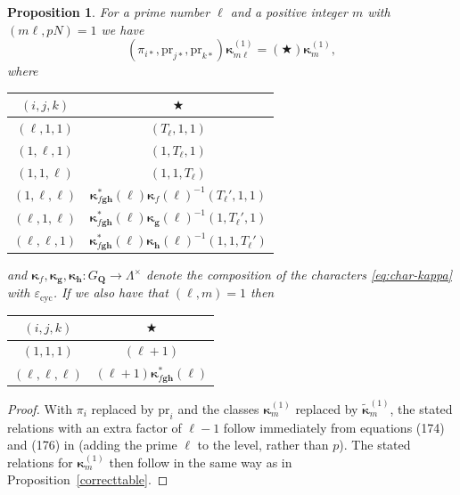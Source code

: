 \documentclass[10pt,letterpaper]{amsart}
\theoremstyle{plain}
\theoremstyle{definition}
\theoremstyle{definition}
\theoremstyle{plain}
\newtheorem{prop}[thm]{Proposition}
\theoremstyle{plain}
\theoremstyle{plain}
\theoremstyle{remark}
\numberwithin{equation}{section}
\newcommand{\Q}{\mathbf{Q}}
\newcommand{\bfg}{{\boldsymbol{g}}}
\newcommand{\bfh}{{\boldsymbol{h}}}
\begin{document}
\begin{prop}\label{table2}
For a prime number $\ell$ and a positive integer $m$ with $(m\ell,pN)=1$ we have
\begin{equation*} (\pi_{i*},{\mathrm{pr}}_{j*},{\mathrm{pr}}_{k*})\boldsymbol{\kappa}_{m\ell}^{(1)}= (\bigstar)\boldsymbol{\kappa}_{m}^{(1)},
\end{equation*}
where
\begin{center}
\begin{tabular}{|c|c| } 
 \hline
 $(i,j,k)$ & $\bigstar$  \\ 
 \hline
  $(\ell,1,1)$& $(T_\ell,1,1)$  \\ 
  $(1,\ell,1)$&  $(1,T_\ell,1)$     \\
  $(1,1,\ell)$& $(1,1,T_\ell)$ \\
  $(1,\ell,\ell)$& $\boldsymbol{\kappa}_{f\bfg\bfh}^*(\ell)\boldsymbol{\kappa}_f(\ell)^{-1}(T_\ell',1,1)$\\
  $(\ell,1,\ell)$& $\boldsymbol{\kappa}_{f\bfg\bfh}^*(\ell)\boldsymbol{\kappa}_\bfg(\ell)^{-1}(1,T_\ell',1)$ \\
  $(\ell,\ell,1)$& $\boldsymbol{\kappa}_{f\bfg\bfh}^*(\ell)\boldsymbol{\kappa}_\bfh(\ell)^{-1}(1,1,T_\ell')$ \\
 \hline
\end{tabular}
\end{center}
and $\boldsymbol{\kappa}_f,\boldsymbol{\kappa}_{\bfg},\boldsymbol{\kappa}_{\bfh}:G_\Q\rightarrow\Lambda^\times$ denote the composition of the characters \eqref{eq:char-kappa} with $\varepsilon_{\mathrm{cyc}}$.
If we also have that $(\ell,m)=1$ then
\begin{center}
\begin{tabular}{|c|c| } 
 \hline
 $(i,j,k)$ & $\bigstar$  \\ 
 \hline
  $(1,1,1)$& $(\ell+1)$  \\ 
  $(\ell,\ell,\ell)$&  $(\ell+1)\boldsymbol{\kappa}_{f\bfg\bfh}^*(\ell)$     \\
 
 \hline
\end{tabular}
\end{center}
\end{prop}

\begin{proof}
With $\pi_i$ replaced by ${\mathrm{pr}}_i$ and the classes $\boldsymbol{\kappa}_m^{(1)}$ replaced by $\tilde{\boldsymbol{\kappa}}_m^{(1)}$, the stated relations with an extra factor of $\ell-1$ follow immediately from equations (174) and (176) in \cite{BSV} (adding the prime $\ell$ to the level, rather than $p$). The stated relations for $\boldsymbol{\kappa}_m^{(1)}$ then follow in the same way as in Proposition~\ref{correcttable}.
\end{proof}
\end{document}
